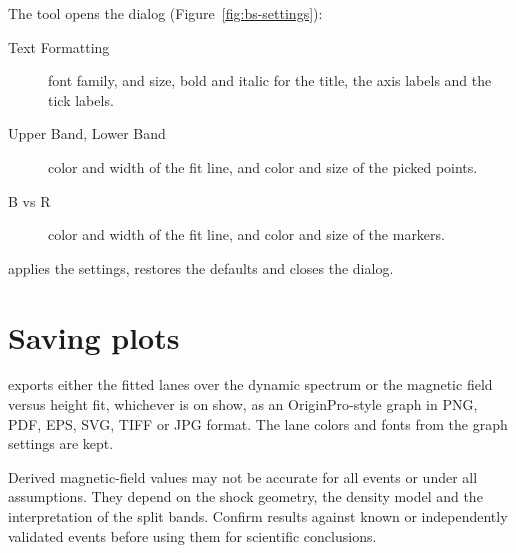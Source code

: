 The  tool  opens the  dialog
(Figure~\ref{fig:bs-settings}):
\begin{description}
  \item[Text Formatting] font family, and size, bold and italic for the title, the axis
    labels and the tick labels.
  \item[Upper Band, Lower Band] color and width of the fit line, and color and size of
    the picked points.
  \item[B vs R] color and width of the fit line, and color and size of the markers.
\end{description}
 applies the settings,  restores the defaults and
 closes the dialog.


\section{Saving plots}

  exports either the fitted lanes over the dynamic spectrum or the
magnetic field versus height fit, whichever is on show, as an OriginPro-style graph in PNG,
PDF, EPS, SVG, TIFF or JPG format. The lane colors and fonts from the graph settings are
kept.

\begin{caution}
  Derived magnetic-field values may not be accurate for all events or under all
  assumptions. They depend on the shock geometry, the density model and the
  interpretation of the split bands. Confirm results against known or independently
  validated events before using them for scientific conclusions.
\end{caution}
